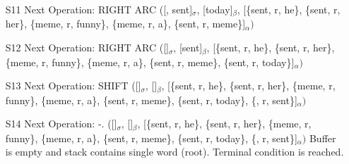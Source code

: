 \documentclass[twoside]{homework}
\begin{document}
\begin{itemize}
    \item [S11] Next Operation: RIGHT ARC\newline\newline
    ([, sent]$_\sigma$, [today]$_\beta$, [\{sent, r, he\}, \{sent, r, her\}, \{meme, r, funny\}, \{meme, r, a\}, \{sent, r, meme\}]$_\alpha)$
    \item [S12] Next Operation: RIGHT ARC\newline\newline
    ([]$_\sigma$, [sent]$_\beta$, [\{sent, r, he\}, \{sent, r, her\}, \{meme, r, funny\}, \{meme, r, a\}, \{sent, r, meme\}, \{sent, r, today\}]$_\alpha)$
    \item [S13] Next Operation: SHIFT\newline\newline
    ([]$_\sigma$, []$_\beta$, [\{sent, r, he\}, \{sent, r, her\}, \{meme, r, funny\}, \{meme, r, a\}, \{sent, r, meme\}, \{sent, r, today\}, \{, r, sent\}]$_\alpha)$
    \item [S14] Next Operation: -. \newline\newline
    ([]$_\sigma$, []$_\beta$, [\{sent, r, he\}, \{sent, r, her\}, \{meme, r, funny\}, \{meme, r, a\}, \{sent, r, meme\}, \{sent, r, today\}, \{, r, sent\}]$_\alpha)$\newline\newline
    Buffer is empty and stack contains single word (root). Terminal condition is reached.
\end{itemize}

\newpage
\end{document}
